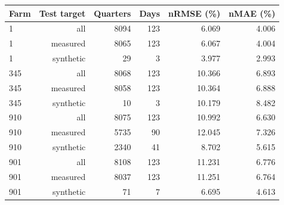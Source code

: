 \begingroup\small
\begin{longtable}{lrrrrr}
\toprule
Farm & Test target & Quarters & Days & nRMSE (\%) & nMAE (\%)\\
\midrule\endhead
1 & all & 8094 & 123 & 6.069 & 4.006\\
1 & measured & 8065 & 123 & 6.067 & 4.004\\
1 & synthetic & 29 & 3 & 3.977 & 2.993\\
345 & all & 8068 & 123 & 10.366 & 6.893\\
345 & measured & 8058 & 123 & 10.364 & 6.888\\
345 & synthetic & 10 & 3 & 10.179 & 8.482\\
910 & all & 8075 & 123 & 10.992 & 6.630\\
910 & measured & 5735 & 90 & 12.045 & 7.326\\
910 & synthetic & 2340 & 41 & 8.702 & 5.615\\
901 & all & 8108 & 123 & 11.231 & 6.776\\
901 & measured & 8037 & 123 & 11.251 & 6.764\\
901 & synthetic & 71 & 7 & 6.695 & 4.613\\
\bottomrule
\end{longtable}
\endgroup
